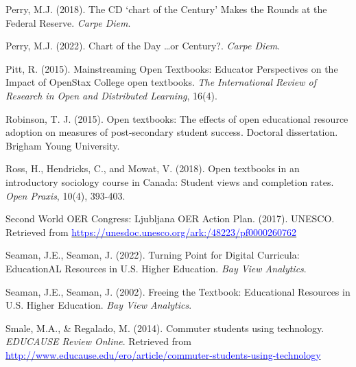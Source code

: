 \documentclass[11pt]{article}
\newcommand{\alink}[2]{\href{#1}{\textcolor{blue}{#2}}}
\begin{document}
\begin{thebibliography}{99}
   Perry, M.J. (2018). The CD `chart of the Century' Makes the Rounds at the Federal Reserve. {\em Carpe Diem}.%

   Perry, M.J. (2022). Chart of the Day \ldots or Century?. {\em Carpe Diem}.%

   Pitt, R. (2015). Mainstreaming Open Textbooks: Educator Perspectives on the Impact of OpenStax College open textbooks. {\em The International Review of Research in Open and Distributed Learning}, 16(4).

   Robinson, T. J. (2015). Open textbooks: The effects of open educational resource adoption on measures of post-secondary student success. Doctoral dissertation. Brigham Young University.

   Ross, H., Hendricks, C., and Mowat, V. (2018). Open textbooks in an introductory sociology course in Canada: Student views and completion rates. {\em Open Praxis}, 10(4), 393-403.

   Second World OER Congress: Ljubljana OER Action Plan. (2017). UNESCO. \newline Retrieved from \alink{https://unesdoc.unesco.org/ark:/48223/pf0000260762}{https://unesdoc.unesco.org/ark:/48223/pf0000260762}

   Seaman, J.E., Seaman, J. (2022). Turning Point for Digital Curricula: EducationAL Resources in U.S. Higher Education. {\em Bay View Analytics}.%

   Seaman, J.E., Seaman, J. (2002). Freeing the Textbook: Educational Resources in U.S. Higher Education. {\em Bay View Analytics}. %

   Smale, M.A., \& Regalado, M. (2014). Commuter students using technology. {\em EDUCAUSE Review Online}. Retrieved from \alink{http://www.educause.edu/ero/article/commuter-students-using-technology}{http://www.educause.edu/ero/article/commuter-students-using-technology}  


\end{thebibliography}
\end{document}
